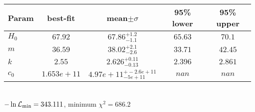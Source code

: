 \begin{tabular}{|l|c|c|c|c|} 
 \hline 
Param & best-fit & mean$\pm\sigma$ & 95\% lower & 95\% upper \\ \hline 
$H_{0 }$ &$67.92$ & $67.86_{-1.1}^{+1.2}$ & $65.63$ & $70.1$ \\ 
$m$ &$36.59$ & $38.02_{-2.6}^{+2.1}$ & $33.71$ & $42.45$ \\ 
$k$ &$2.55$ & $2.626_{-0.13}^{+0.11}$ & $2.396$ & $2.861$ \\ 
$c_{0 }$ &$1.653e+11$ & $4.97e+11_{-5e+11}^{+-2.6e+11}$ & $nan$ & $nan$ \\ 
\hline 
 \end{tabular} \\ 
$-\ln{\cal L}_\mathrm{min} =343.111$, minimum $\chi^2=686.2$ \\ 
